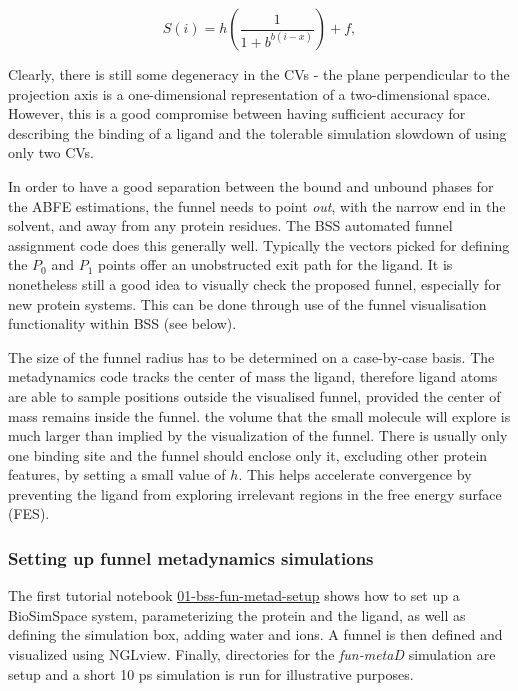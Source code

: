 \begin{equation}
S(i) = h\left(\frac{1}{1+b^{b(i-x)}}\right) + f,
\end{equation}

Clearly, there is still some degeneracy in the CVs - the plane
perpendicular to the projection axis is a one-dimensional representation of a two-dimensional space. However, this is a good compromise between having sufficient accuracy for describing the binding of a ligand and the tolerable simulation slowdown of using only two CVs.

In order to have a good separation between the bound and unbound phases for the ABFE estimations, the funnel needs to point \emph{out}, with the narrow end in the solvent,
and away from any protein residues. The BSS automated funnel assignment code does this generally well. Typically the vectors picked for defining the $P_{0}$ and $P_{1}$ points offer an unobstructed exit path for the ligand. It is nonetheless still a good idea to visually check the proposed funnel, especially for new protein systems. This can be done through use of the funnel visualisation functionality within BSS (see below).

The size of the funnel radius has to be determined on a case-by-case basis. The metadynamics code tracks the center of mass the ligand, therefore ligand atoms are able to sample positions outside the visualised funnel, provided the center of mass remains inside the funnel. the volume that the small molecule will explore is much larger than implied by the visualization of the funnel. There is usually only one binding site and the funnel should enclose only it, excluding other protein features, by setting a small value of $h$. This helps accelerate convergence by preventing the ligand from exploring irrelevant regions in the free energy surface (FES). 

\hypertarget{setupfunmetad}{%
\subsubsection{Setting up funnel metadynamics simulations}\label{setupfunmetad}}

The first tutorial notebook \href{https://github.com/OpenBioSim/biosimspace_tutorials/blob/main/02_funnel_metad/01_bss-fun-metad-setup.ipynb}{01-bss-fun-metad-setup} shows how to set up a BioSimSpace system, parameterizing the protein and the ligand, as well as defining the simulation box, adding water and ions. A funnel is then defined and visualized using NGLview. Finally, directories for the \emph{fun-metaD} simulation are setup and a short 10 ps simulation is run for illustrative purposes.


